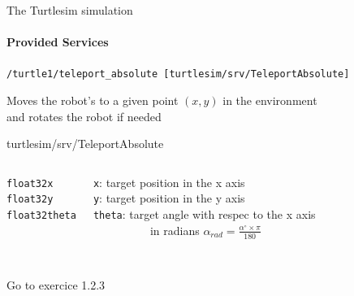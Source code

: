 \documentclass[compress]{beamer}
\begin{document}
\begin{frame}{The Turtlesim simulation}
\framesubtitle{{\bf Provided Services}}
\footnotesize
 \texttt{/turtle1/teleport\_absolute [turtlesim/srv/TeleportAbsolute]}\\ \vspace{.5cm}
 
 Moves the robot's to a given point $(x,y)$ in the environment \\
 {\tiny and rotates the robot if needed}
 
 
 \vspace{.5cm}
 \begin{block}{{\tiny turtlesim/srv/TeleportAbsolute}}
 \begin{columns}
   
    
       \tiny
         \begin{alltt}
            float32 x\\
            float32 y\\
            float32 theta\\
            \ \\
            \ \\
        \end{alltt}
     \tiny
     \texttt{x}: target position in the x axis\\ \vspace{.1cm}
     \texttt{y}: target position in the y axis\\ \vspace{.1cm}
     \texttt{theta}: target angle with respec to the x axis\\
     {\tiny \ \ \ \ \ \ \ \ \ \ in radians }
     {\tiny $\alpha_{rad}=\frac{\alpha^{\circ}\times \pi}{180}$}
 \end{columns}
 \end{block}
 
 
\vfill 
 
{\tiny Go to exercice 1.2.3} 
 
\end{frame}
\end{document}
